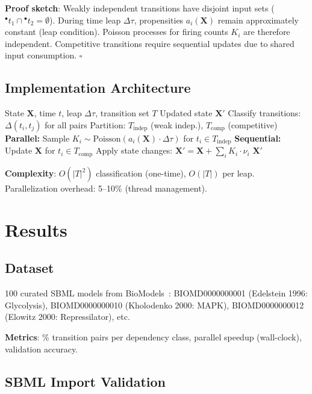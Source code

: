 \documentclass[twocolumn,11pt]{article}
\newcommand{\preset}[1]{\ensuremath{{}^{\bullet}#1}}
\begin{document}
\textbf{Proof sketch}: Weakly independent transitions have disjoint input sets ($\preset{t_1} \cap \preset{t_2} = \emptyset$). During time leap $\Delta\tau$, propensities $a_i(\mathbf{X})$ remain approximately constant (leap condition). Poisson processes for firing counts $K_i$ are therefore independent. Competitive transitions require sequential updates due to shared input consumption. $\square$

\subsection{Implementation Architecture}

\begin{algorithm}[t]
\caption{Parallel $\tau$-Leaping Scheduler}
\label{alg:parallel_tau}
\begin{algorithmic}[1]
\REQUIRE State $\mathbf{X}$, time $t$, leap $\Delta\tau$, transition set $T$
\ENSURE Updated state $\mathbf{X}'$
\STATE Classify transitions: $\Delta(t_i, t_j)$ for all pairs
\STATE Partition: $T_{\text{indep}}$ (weak indep.), $T_{\text{comp}}$ (competitive)
\STATE \textbf{Parallel:} Sample $K_i \sim \text{Poisson}(a_i(\mathbf{X}) \cdot \Delta\tau)$ for $t_i \in T_{\text{indep}}$
\STATE \textbf{Sequential:} Update $\mathbf{X}$ for $t_i \in T_{\text{comp}}$
\STATE Apply state changes: $\mathbf{X}' = \mathbf{X} + \sum_i K_i \cdot \nu_i$
\RETURN $\mathbf{X}'$
\end{algorithmic}
\end{algorithm}

\textbf{Complexity}: $O(|T|^2)$ classification (one-time), $O(|T|)$ per leap. Parallelization overhead: 5--10\% (thread management).

\section{Results}

\subsection{Dataset}

100 curated SBML models from BioModels~\cite{Malik2020}: BIOMD0000000001 (Edelstein 1996: Glycolysis), BIOMD0000000010 (Kholodenko 2000: MAPK), BIOMD0000000012 (Elowitz 2000: Repressilator), etc.

\textbf{Metrics}: \% transition pairs per dependency class, parallel speedup (wall-clock), validation accuracy.

\subsection{SBML Import Validation}
\end{document}
